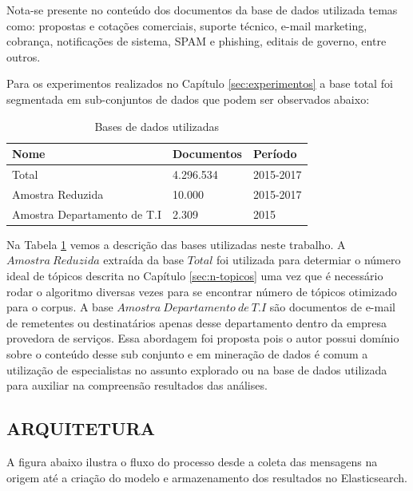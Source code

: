 \documentclass[12pt,a4paper]{article}
\begin{document}
Nota-se presente no conteúdo dos documentos da base de dados utilizada temas como: propostas e cotações comerciais, suporte técnico,
 e-mail marketing, cobrança, notificações de sistema, SPAM e phishing, editais de governo, entre outros.

Para os experimentos realizados no Capítulo \ref{sec:experimentos} a base total foi segmentada em sub-conjuntos de dados que podem ser observados abaixo:

\begin{table}[H]
  \centering
  \begin{tabular}{l l l}
  Nome  		              & Documentos & Período\\
  \hline
  Total                           & 4.296.534 & 2015-2017 \\
  Amostra Reduzida	              & 10.000    & 2015-2017 \\
  Amostra Departamento de T.I		  & 2.309     & 2015      \\
  \hline
  \end{tabular}
  \caption{Bases de dados utilizadas}
  \label{tab-base-de-dados}
\end{table}

Na Tabela \ref{tab-base-de-dados} vemos a descrição das bases utilizadas neste trabalho. A $Amostra\ Reduzida$ extraída da base $Total$ foi utilizada para determiar o número ideal de tópicos
 descrita no Capítulo \ref{sec:n-topicos} uma vez que é necessário rodar o algoritmo diversas vezes para se encontrar número de tópicos otimizado para 
 o corpus. A base $Amostra\ Departamento\ de\ T.I$ são documentos de e-mail de remetentes ou destinatários apenas desse departamento dentro da empresa provedora
 de serviços. Essa abordagem foi proposta pois o autor possui domínio sobre o conteúdo desse sub conjunto e em mineração de dados é comum a utilização de especialistas
 no assunto explorado ou na base de dados utilizada para auxiliar na compreensão resultados das análises.

 \subsection{ARQUITETURA} \label{sec:arquitetura}

 A figura abaixo ilustra o fluxo do processo desde a coleta das mensagens na origem até a criação do modelo e armazenamento dos resultados no Elasticsearch.
\end{document}
